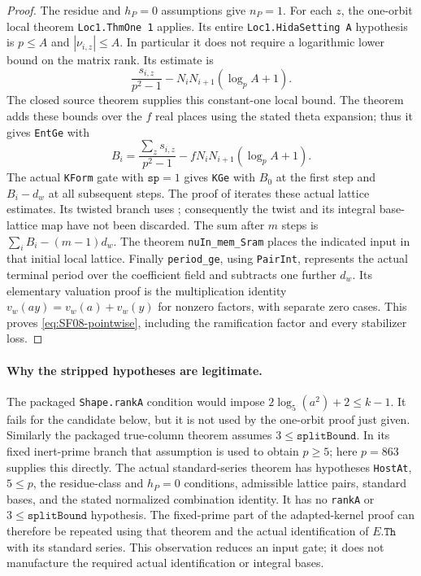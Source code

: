 \documentclass[11pt,a4paper]{article}
\theoremstyle{definition}
\theoremstyle{remark}
\begin{document}
\begin{proof}
The residue and $h_P=0$ assumptions give $n_P=1$.
For each $z$, the one-orbit local theorem
\texttt{Loc1.ThmOne 1} applies.  Its entire
\texttt{Loc1.HidaSetting A} hypothesis is
$p\le A$ and $|\nu_{i,z}|\le A$.
In particular it does not require a logarithmic lower bound on the
matrix rank.  Its estimate is
\[
 \frac{s_{i,z}}{p^2-1}
       -N_iN_{i+1}(\log_p A+1).
\]
The closed source theorem
 supplies this constant-one local
bound.  The theorem  adds these
bounds over the $f$ real places using the stated theta expansion;
thus it gives \texttt{EntGe} with
\[
 B_i=\frac{\sum_zs_{i,z}}{p^2-1}
                   -fN_iN_{i+1}(\log_p A+1).
\]
The actual \texttt{KForm} gate with $\texttt{sp}=1$ gives
\texttt{KGe} with $B_0$ at the first step and $B_i-d_w$ at
all subsequent steps.  The proof of 
iterates these actual lattice estimates.  Its twisted branch uses
; consequently the twist
and its integral base-lattice map have not been discarded.
The sum after $m$ steps is $\sum_i B_i-(m-1)d_w$.
The theorem \texttt{nuIn\_mem\_Sram} places the indicated input in
that initial local lattice.  Finally \texttt{period\_ge}, using
\texttt{PairInt}, represents the actual terminal period over the
coefficient field and subtracts one further $d_w$.  Its elementary
valuation proof is the multiplication identity
$v_w(ay)=v_w(a)+v_w(y)$ for nonzero factors, with separate zero cases.
This proves \eqref{eq:SF08-pointwise}, including the ramification
factor and every stabilizer loss.
\end{proof}

\paragraph{Why the stripped hypotheses are legitimate.}
The packaged \texttt{Shape.rankA} condition would impose
$2\log_5(a^2)+2\le k-1$.  It fails for the candidate below, but
it is not used by the one-orbit proof just given.  Similarly the
packaged true-column theorem assumes $3\le\texttt{splitBound}$.
In its fixed inert-prime branch that assumption is used to obtain
$p\ge5$; here $p=863$ supplies this directly.
The actual standard-series theorem
 has hypotheses
\texttt{HostAt}, $5\le p$, the residue-class and $h_P=0$ conditions,
admissible lattice pairs, standard bases, and the stated normalized
combination identity.  It has no \texttt{rankA} or
$3\le\texttt{splitBound}$ hypothesis.  The fixed-prime part of the
adapted-kernel proof can therefore be repeated using that theorem
and the actual identification of $E.\texttt{Th}$ with its standard
series.  This observation reduces an input gate; it does not
manufacture the required actual identification or integral bases.
\end{document}
